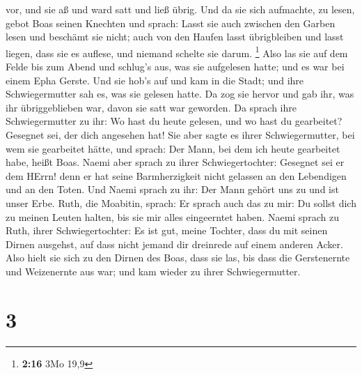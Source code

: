 vor, und sie aß und ward satt und ließ übrig.  Und da sie
sich aufmachte, zu lesen, gebot Boas seinen Knechten und sprach: Lasst
sie auch zwischen den Garben lesen und beschämt sie nicht;
 auch von den Haufen lasst übrigbleiben und lasst liegen,
dass sie es auflese, und niemand schelte sie darum. \footnote{\textbf{2:16}
  3Mo 19,9}  Also las sie auf dem Felde bis zum Abend und
schlug's aus, was sie aufgelesen hatte; und es war bei einem Epha
Gerste.  Und sie hob's auf und kam in die Stadt; und ihre
Schwiegermutter sah es, was sie gelesen hatte. Da zog sie hervor und gab
ihr, was ihr übriggeblieben war, davon sie satt war geworden.
 Da sprach ihre Schwiegermutter zu ihr: Wo hast du heute
gelesen, und wo hast du gearbeitet? Gesegnet sei, der dich angesehen
hat! Sie aber sagte es ihrer Schwiegermutter, bei wem sie gearbeitet
hätte, und sprach: Der Mann, bei dem ich heute gearbeitet habe, heißt
Boas.  Naemi aber sprach zu ihrer Schwiegertochter:
Gesegnet sei er dem HErrn! denn er hat seine Barmherzigkeit nicht
gelassen an den Lebendigen und an den Toten. Und Naemi sprach zu ihr:
Der Mann gehört uns zu und ist unser Erbe.  Ruth, die
Moabitin, sprach: Er sprach auch das zu mir: Du sollst dich zu meinen
Leuten halten, bis sie mir alles eingeerntet haben. 
Naemi sprach zu Ruth, ihrer Schwiegertochter: Es ist gut, meine Tochter,
dass du mit seinen Dirnen ausgehst, auf dass nicht jemand dir dreinrede
auf einem anderen Acker.  Also hielt sie sich zu den
Dirnen des Boas, dass sie las, bis dass die Gerstenernte und Weizenernte
aus war; und kam wieder zu ihrer Schwiegermutter.

\hypertarget{section-2}{%
\section{3}\label{section-2}}

